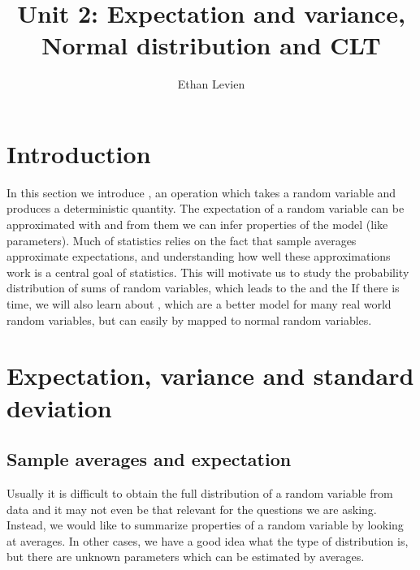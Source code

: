 

\setcounter{unit}{2}
\setcounter{section}{0}




\title{Unit 2: Expectation and variance, Normal distribution and CLT}
\author{Ethan Levien}
\maketitle
\tableofcontents



\section*{Introduction}


In this section we introduce , an operation which takes a random variable and produces a deterministic quantity. The expectation of a random variable can be approximated with  and from them we can infer properties of the model (like parameters). Much of statistics relies on the fact that sample averages approximate expectations, and understanding how well these approximations work is a central goal of statistics. This will motivate us to study the probability distribution of sums of random variables, which leads to the  and the  If there is time, we will also learn about , which are a better model for many real world random variables, but can easily by mapped to normal random variables. 





\section{Expectation, variance and standard deviation}




\subsection{Sample averages and expectation}
 Usually it is difficult to obtain the full distribution of a random variable from data and it may not even be that relevant for the questions we are asking. Instead, we would like to summarize properties of a random variable by looking at averages.  In other cases, we have a good idea what the type of distribution is, but there are unknown parameters which can be estimated by averages.  
 
